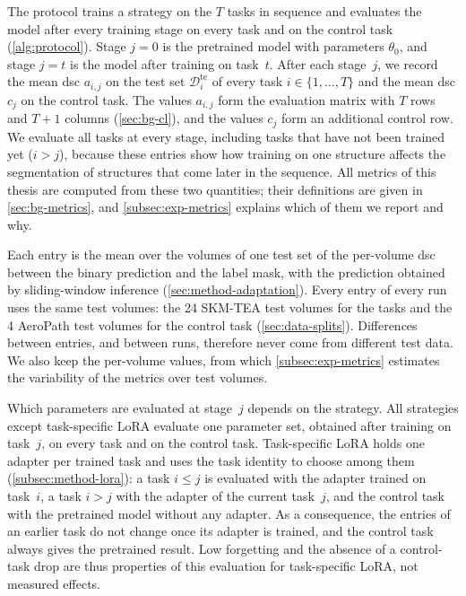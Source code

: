 The protocol trains a strategy on the $T$ tasks in sequence and evaluates the model after every training stage on every task and on the control task (\cref{alg:protocol}).
Stage $j = 0$ is the pretrained model with parameters $\theta_0$, and stage $j = t$ is the model after training on task~$t$.
After each stage~$j$, we record the mean \gls{dsc} $a_{i,j}$ on the test set $\mathcal{D}_i^{\mathrm{te}}$ of every task $i \in \{1, \dots, T\}$ and the mean \gls{dsc} $c_j$ on the control task.
The values $a_{i,j}$ form the evaluation matrix with $T$ rows and $T+1$ columns (\cref{sec:bg-cl}), and the values $c_j$ form an additional control row.
We evaluate all tasks at every stage, including tasks that have not been trained yet ($i > j$), because these entries show how training on one structure affects the segmentation of structures that come later in the sequence.
All metrics of this thesis are computed from these two quantities; their definitions are given in \cref{sec:bg-metrics}, and \cref{subsec:exp-metrics} explains which of them we report and why.

Each entry is the mean over the volumes of one test set of the per-volume \gls{dsc} between the binary prediction and the label mask, with the prediction obtained by sliding-window inference (\cref{sec:method-adaptation}).
Every entry of every run uses the same test volumes: the 24 SKM-TEA test volumes for the tasks and the 4 AeroPath test volumes for the control task (\cref{sec:data-splits}).
Differences between entries, and between runs, therefore never come from different test data.
We also keep the per-volume values, from which \cref{subsec:exp-metrics} estimates the variability of the metrics over test volumes.

Which parameters are evaluated at stage~$j$ depends on the strategy.
All strategies except task-specific LoRA evaluate one parameter set, obtained after training on task~$j$, on every task and on the control task.
Task-specific LoRA holds one adapter per trained task and uses the task identity to choose among them (\cref{subsec:method-lora}): a task $i \le j$ is evaluated with the adapter trained on task~$i$, a task $i > j$ with the adapter of the current task~$j$, and the control task with the pretrained model without any adapter.
As a consequence, the entries of an earlier task do not change once its adapter is trained, and the control task always gives the pretrained result.
Low forgetting and the absence of a control-task drop are thus properties of this evaluation for task-specific LoRA, not measured effects.

